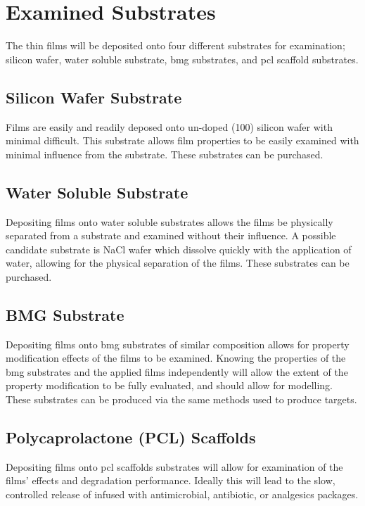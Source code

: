 \documentclass[a4paper,12pt,oneside]{report}%
\begin{document}
\section{Examined Substrates} 
The thin films will be deposited onto four different substrates for examination; silicon wafer, water soluble substrate, \gls{bmg} substrates, and \gls{pcl} scaffold substrates.

\subsection{Silicon Wafer Substrate}
Films are easily and readily deposed onto un-doped (100) silicon wafer with minimal difficult. This substrate allows film properties to be easily examined with minimal influence from the substrate. These substrates can be purchased. 

\subsection{Water Soluble Substrate} 
Depositing films onto water soluble substrates allows the films be physically separated from a substrate and examined without their influence. A possible candidate substrate is NaCl wafer which dissolve quickly with the application of water, allowing for the physical separation of the films. These substrates can be purchased. 

\subsection{BMG Substrate}
Depositing films onto \gls{bmg} substrates of similar composition allows for property modification effects of the films to be examined. Knowing the properties of the \gls{bmg} substrates and the applied films independently will allow the extent of the property modification to be fully evaluated, and should allow for modelling. These substrates can be produced via the same methods used to produce targets. 

\subsection{Polycaprolactone (PCL) Scaffolds}
Depositing films onto \gls{pcl} scaffolds substrates will allow for examination of the films' effects and degradation performance. Ideally this will lead to the slow, controlled release of infused with antimicrobial, antibiotic, or analgesics packages.
\end{document}
